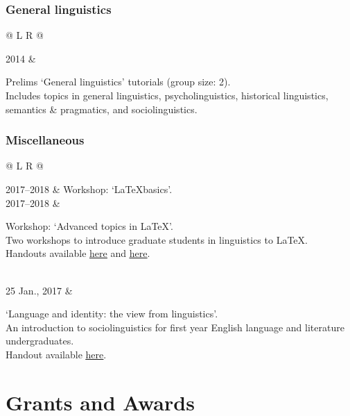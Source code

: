 \documentclass[11pt,a4paper,twoside]{article}
\makeatletter
\newcommand{\bodywidth}{0.82}
\newenvironment{cvsection}{%
  \setlength{\extrarowheight}{0.70ex}
  \begin{longtable}[l]{@{} L R @{}}
}{%
  \end{longtable}
}
\newcommand{\Note}[2]{%
\parbox[t]{\bodywidth\textwidth}{#1\\{\footnotesize #2}}%
}
\makeatother
\begin{document}
\subsubsection*{General linguistics}
\begin{cvsection}
  2014				&	\Note{%
                Prelims `General linguistics' tutorials (group size: 2).}
                {Includes topics in general linguistics, psycholinguistics, historical
                linguistics, semantics \& pragmatics, and sociolinguistics.}
\end{cvsection}

\subsubsection*{Miscellaneous}
\begin{cvsection}
	2017--2018	& Workshop: `\LaTeX* basics'.\\
	2017--2018	& \Note{%
                Workshop: `Advanced topics in \LaTeX*'.}
                {Two workshops to introduce graduate students in linguistics to \LaTeX*.\\
                Handouts available \href{http://users.ox.ac.uk/~sjoh2787/latex-basics.pdf}{\uline{here}} and \href{http://users.ox.ac.uk/~sjoh2787/latex-advanced-topics.pdf}{\uline{here}}.}\\
	25 Jan., 2017	& \Note{%
                  `Language and identity: the view from linguistics'.}
                  {An introduction to sociolinguistics for first year English language and literature undergraduates.\\
                  Handout available \href{http://users.ox.ac.uk/~sjoh2787/Socio_presentation.pdf}{\uline{here}}.}
\end{cvsection}


\section*{Grants and Awards}
\end{document}
